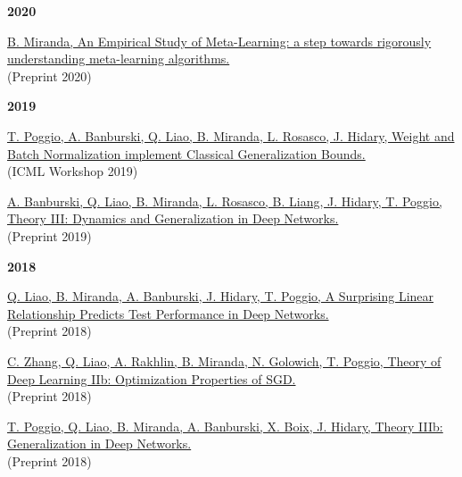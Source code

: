 \documentclass{article}
\newenvironment{changemargin}[2]{%
  \begin{list}{}{%
    \setlength{\topsep}{0pt}%
    \setlength{\leftmargin}{#1}%
    \setlength{\rightmargin}{#2}%
    \setlength{\listparindent}{\parindent}%
    \setlength{\itemindent}{\parindent}%
    \setlength{\parsep}{\parskip}%
  }%
  \item[]}{\end{list}
}
\newenvironment{body} {
	\vspace*{-16pt}
	\begin{changemargin}{-0.25in}{-0.5in}
  }	
	{\end{changemargin}
}
\begin{document}
\begin{body}
    \vspace{12pt}
    \textbf{\large 2020}
    \vspace{4pt}

    \vspace{10pt}
    \href{https://www.ideals.illinois.edu/handle/2142/109139}
    {B. Miranda,
    An Empirical Study of Meta-Learning: a step towards rigorously understanding meta-learning algorithms.}
    \\
    (Preprint 2020)

    \vspace{12pt}
    \textbf{\large 2019}
    \vspace{4pt}

    \vspace{10pt}
    \href{https://drive.google.com/file/d/1G2IVmbENphwB3lxROEpCHQjsClKqRtKP/view}
    {T. Poggio, A. Banburski, Q. Liao, B. Miranda, L. Rosasco, J. Hidary,
    Weight and Batch Normalization implement Classical Generalization Bounds.}
    \\
    (ICML Workshop 2019)

    \vspace{10pt}
    \href{https://arxiv.org/abs/1903.04991}
    {A. Banburski, Q. Liao, B. Miranda, L. Rosasco, B. Liang, J. Hidary, T. Poggio,
    Theory III: Dynamics and Generalization in Deep Networks.}
    \\
    (Preprint 2019)

    \vspace{12pt}
    \textbf{\large 2018}
    \vspace{4pt}

    \vspace{10pt}
    \href{https://arxiv.org/abs/1807.09659}
    {Q. Liao, B. Miranda, A. Banburski, J. Hidary, T. Poggio,
    A Surprising Linear Relationship Predicts Test Performance in Deep Networks.}
    \\
    (Preprint 2018)

    \vspace{10pt}
    \href{https://arxiv.org/abs/1801.02254}
    {C. Zhang, Q. Liao, A. Rakhlin, B. Miranda, N. Golowich, T. Poggio,
    Theory of Deep Learning IIb: Optimization Properties of SGD.}
    \\
    (Preprint 2018)

    \vspace{10pt}
    \href{https://arxiv.org/abs/1806.11379}
    {T. Poggio, Q. Liao, B. Miranda, A. Banburski, X. Boix, J. Hidary,
    Theory IIIb: Generalization in Deep Networks.}
    \\
    (Preprint 2018)


\end{body}
\end{document}
